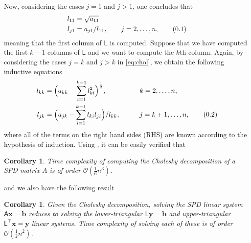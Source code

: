 \documentclass[10pt]{article}
\newtheorem{cor}[thm]{Corollary}
\theoremstyle{definition}
\newcommand\eqnum{\addtocounter{equation}{1}\tag{\arabic{section}.\arabic{equation}}}
\begin{document}
Now, considering the cases $j=1$ and $j>1$, one concludes that
\begin{align*}
l_{11} &= \sqrt{a_{11} } \\
l_{j1} &= a_{j1}/l_{11}, \qquad j=2,\dots,n,
\eqnum
\end{align*}
meaning that the first column of $\mathsf{L}$ is computed. Suppose that we have computed the first $k-1$ columns of $\mathsf{L}$ and we want to compute the $k$th column. Again, by considering the cases $j=k$ and $j>k$ in \cref{eq:chol}, we obtain the following inductive equations
\begin{alignat*}{2}
l_{kk} &= \Big(a_{kk} - \sum_{i=1}^{k-1}l_{ki}^2\Big)^{\frac{1}{2}}, && k=2,\dots,n, \\ 
l_{jk} &= \Big(a_{jk}-\sum_{i=1}^{k-1}l_{ki}l_{ji}\Big)/l_{kk}, \qquad && j = k+1,\dots, n,
\eqnum
\label{eq:chol:alg}
\end{alignat*}
where all of the terms on the right hand sides (RHS) are known according to the hypothesis of induction. Using , it can be easily verified that
\begin{cor}
Time complexity of computing the Cholesky decomposition of a SPD matrix $A$ is of order $\mathcal{O}(\frac{1}{6}n^3)$.
\end{cor}
\noindent
and we also have the following result
\begin{cor}
Given the Cholesky decomposition, solving the SPD linear system $\mathsf{A}\mathbf{x}=\mathbf{b}$ reduces to solving the lower-triangular $\mathsf{L}\mathbf{y} = \mathbf{b}$ and upper-triangular $\mathsf{L}^{\top} \mathbf{x} = \mathbf{y}$  linear systems. Time complexity of solving each of these is of order $\mathcal{O}(\frac{1}{2}n^2)$.
\end{cor}
\end{document}
